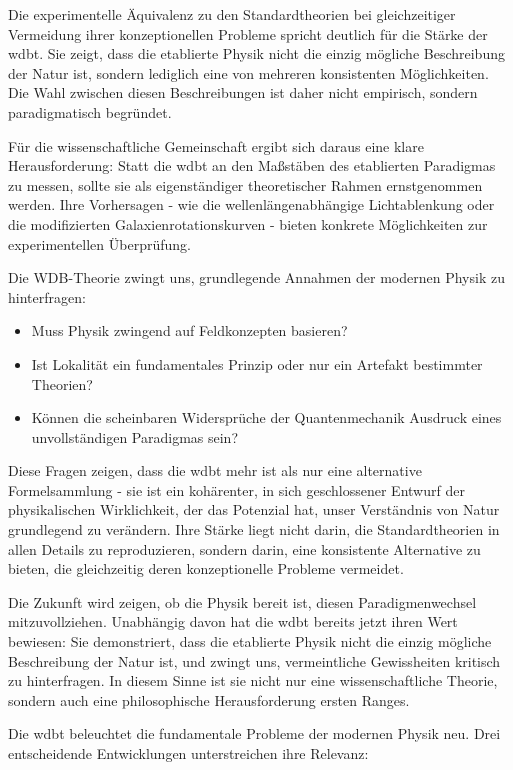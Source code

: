 \documentclass[11pt, a4paper, twoside, openright]{book}
\begin{document}
Die experimentelle Äquivalenz zu den Standardtheorien bei gleichzeitiger Vermeidung ihrer konzeptionellen Probleme spricht deutlich für die Stärke der \gls{wdbt}. Sie zeigt,
dass die etablierte Physik nicht die einzig mögliche Beschreibung der Natur ist, sondern lediglich eine von mehreren konsistenten Möglichkeiten. Die Wahl zwischen diesen Beschreibungen
ist daher nicht empirisch, sondern paradigmatisch begründet.

Für die wissenschaftliche Gemeinschaft ergibt sich daraus eine klare Herausforderung: Statt die \gls{wdbt} an den Maßstäben des etablierten Paradigmas zu messen, sollte sie als
eigenständiger theoretischer Rahmen ernstgenommen werden. Ihre Vorhersagen - wie die wellenlängenabhängige Lichtablenkung oder die modifizierten Galaxienrotationskurven - bieten konkrete
Möglichkeiten zur experimentellen Überprüfung.

Die WDB-Theorie zwingt uns, grundlegende Annahmen der modernen Physik zu hinterfragen:
\begin{itemize}
    \item Muss Physik zwingend auf Feldkonzepten basieren?
    \item Ist Lokalität ein fundamentales Prinzip oder nur ein Artefakt bestimmter Theorien?
    \item Können die scheinbaren Widersprüche der Quantenmechanik Ausdruck eines unvollständigen Paradigmas sein?
\end{itemize}
Diese Fragen zeigen, dass die \gls{wdbt} mehr ist als nur eine alternative Formelsammlung - sie ist ein kohärenter, in sich geschlossener Entwurf der physikalischen Wirklichkeit,
der das Potenzial hat, unser Verständnis von Natur grundlegend zu verändern. Ihre Stärke liegt nicht darin, die Standardtheorien in allen Details zu reproduzieren, sondern darin,
eine konsistente Alternative zu bieten, die gleichzeitig deren konzeptionelle Probleme vermeidet.

Die Zukunft wird zeigen, ob die Physik bereit ist, diesen Paradigmenwechsel mitzuvollziehen. Unabhängig davon hat die \gls{wdbt} bereits jetzt ihren Wert bewiesen: Sie demonstriert,
dass die etablierte Physik nicht die einzig mögliche Beschreibung der Natur ist, und zwingt uns, vermeintliche Gewissheiten kritisch zu hinterfragen. In diesem Sinne ist sie nicht
nur eine wissenschaftliche Theorie, sondern auch eine philosophische Herausforderung ersten Ranges.

Die \gls{wdbt} beleuchtet die fundamentale Probleme der modernen Physik neu. Drei entscheidende Entwicklungen unterstreichen ihre Relevanz:
\end{document}
